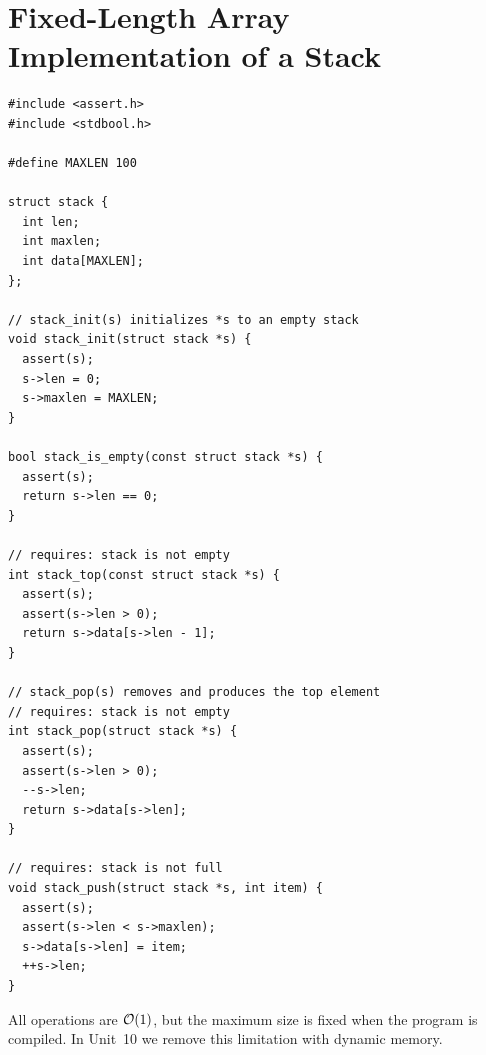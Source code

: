 \begin{center}
\end{center}

\section{Fixed-Length Array Implementation of a Stack}

\begin{lstlisting}[style=c]
#include <assert.h>
#include <stdbool.h>

#define MAXLEN 100

struct stack {
  int len;
  int maxlen;
  int data[MAXLEN];
};

// stack_init(s) initializes *s to an empty stack
void stack_init(struct stack *s) {
  assert(s);
  s->len = 0;
  s->maxlen = MAXLEN;
}

bool stack_is_empty(const struct stack *s) {
  assert(s);
  return s->len == 0;
}

// requires: stack is not empty
int stack_top(const struct stack *s) {
  assert(s);
  assert(s->len > 0);
  return s->data[s->len - 1];
}

// stack_pop(s) removes and produces the top element
// requires: stack is not empty
int stack_pop(struct stack *s) {
  assert(s);
  assert(s->len > 0);
  --s->len;
  return s->data[s->len];
}

// requires: stack is not full
void stack_push(struct stack *s, int item) {
  assert(s);
  assert(s->len < s->maxlen);
  s->data[s->len] = item;
  ++s->len;
}
\end{lstlisting}
All operations are $\mathcal{O}(1)$, but the maximum size is fixed when the program is compiled. In
Unit~10 we remove this limitation with dynamic memory.

